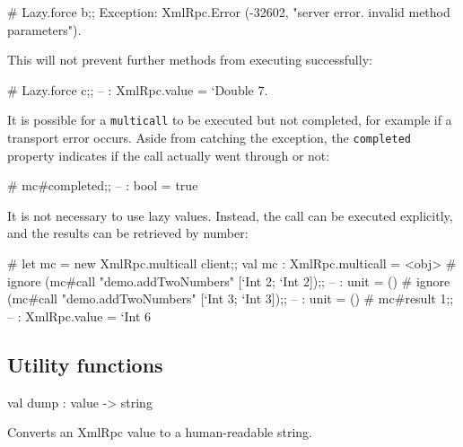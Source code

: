 \documentclass[11pt]{article}
\begin{document}
\begin{ocamldocdescription}
\begin{ocamldoccode}
        # Lazy.force b;;
        Exception: XmlRpc.Error (-32602, "server error. invalid method parameters").
    
\end{ocamldoccode}

    This will not prevent further methods from executing successfully: \begin{ocamldoccode}

        # Lazy.force c;;
        -- : XmlRpc.value = `Double 7.
    
\end{ocamldoccode}

    It is possible for a {\tt{multicall}} to be executed but not completed, for
    example if a transport error occurs. Aside from catching the exception,
    the {\tt{completed}} property indicates if the call actually went through
    or not: \begin{ocamldoccode}

        # mc#completed;;
        -- : bool = true
    
\end{ocamldoccode}

    It is not necessary to use lazy values. Instead, the call can be
    executed explicitly, and the results can be retrieved by number: \begin{ocamldoccode}

        # let mc = new XmlRpc.multicall client;;
        val mc : XmlRpc.multicall = <obj>
        # ignore (mc#call "demo.addTwoNumbers" [`Int 2; `Int 2]);;
        -- : unit = ()
        # ignore (mc#call "demo.addTwoNumbers" [`Int 3; `Int 3]);;
        -- : unit = ()
        # mc#result 1;;
        -- : XmlRpc.value = `Int 6
    
\end{ocamldoccode}



\end{ocamldocdescription}




\subsection{Utility functions}




\label{val:XmlRpc.dump}\begin{ocamldoccode}
val dump : value -> string
\end{ocamldoccode}
\begin{ocamldocdescription}
Converts an XmlRpc value to a human-readable string.


\end{ocamldocdescription}
\end{document}
